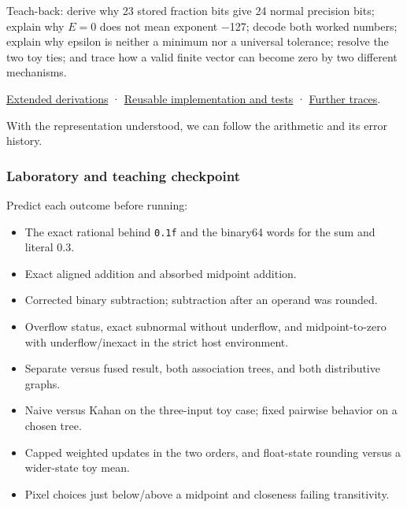 Teach-back: derive why 23 stored fraction bits give 24 normal precision bits; explain why \(E=0\) does not mean exponent −127; decode both worked numbers; explain why epsilon is neither a minimum nor a universal tolerance; resolve the two toy ties; and trace how a valid finite vector can become zero by two different mechanisms.

\hyperref[01-foundations-i-ch011-m004---floating-point-fields-spacing-and-rounding]{Extended derivations} · \hyperref[appendix-4e2236f53445-m004---binary-interchange-inspection-and-strict-rounding-laboratory]{Reusable implementation and tests} · \hyperref[appendix-92ff77d4dfdc-m004---from-fields-to-values-and-failure-paths]{Further traces}.

With the representation understood, we can follow the arithmetic and its error history.

\subsubsection{Laboratory and teaching checkpoint}\label{01-foundations-i-ch001-laboratory-and-teaching-checkpoint}

\hypertarget{01-foundations-i-ch001-laboratory-and-teaching-checkpoint}{}

Predict each outcome before running:

\begin{itemize}
\tightlist
\item
  The exact rational behind \texttt{0.1f} and the binary64 words for the sum and literal 0.3.
\item
  Exact aligned addition and absorbed midpoint addition.
\item
  Corrected binary subtraction; subtraction after an operand was rounded.
\item
  Overflow status, exact subnormal without underflow, and midpoint-to-zero with underflow/inexact in the strict host environment.
\item
  Separate versus fused result, both association trees, and both distributive graphs.
\item
  Naive versus Kahan on the three-input toy case; fixed pairwise behavior on a chosen tree.
\item
  Capped weighted updates in the two orders, and float-state rounding versus a wider-state toy mean.
\item
  Pixel choices just below/above a midpoint and closeness failing transitivity.
\end{itemize}

